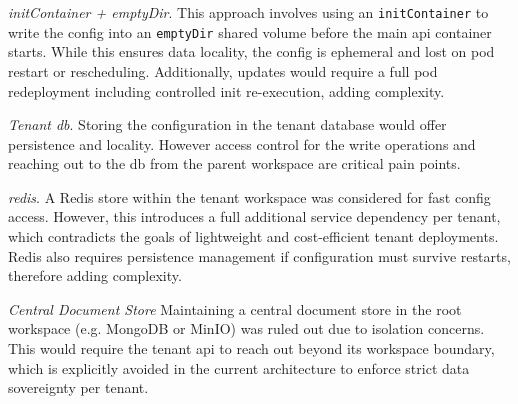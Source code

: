 \documentclass[11pt, a4paper, oneside, listof=totoc]{scrartcl}
\begin{document}
\begin{enumerate}[label={[\arabic*]:},
                    ref=Challenge~\arabic*,
                    leftmargin=*,
                    itemsep=0.6\baselineskip]
                    \item\label{chal:initContainer}
                        \textit{initContainer + emptyDir}.
                        This approach involves using an \texttt{initContainer} to write the config
                        into an \texttt{emptyDir} shared volume before the main \gls{api} container
                        starts.
                        While this ensures data locality, the config is ephemeral and lost on pod
                        restart or rescheduling.
                        Additionally, updates would require a full pod redeployment including
                        controlled init re-execution, adding complexity.

                    \item\label{chal:tenantDB}
                        \textit{Tenant \gls{db}}.
                        Storing the configuration in the tenant database would offer persistence and
                        locality.
                        However access control for the write operations and reaching out to the
                        \gls{db} from the parent workspace are critical pain points.

                    \item\label{chal:redis}
                        \textit{\gls{redis}}.
                        A Redis store within the tenant workspace was considered for fast config
                        access.
                        However, this introduces a full additional service dependency per tenant,
                        which contradicts the goals of lightweight and cost-efficient tenant
                        deployments.
                        Redis also requires persistence management if configuration must survive
                        restarts, therefore adding complexity.

                    \item\label{cahl:centralStore}
                        \textit{Central Document Store}
                        Maintaining a central document store in the root workspace (e.g. MongoDB or
                        MinIO) was ruled out due to isolation concerns.
                        This would require the tenant \gls{api} to reach out beyond its workspace
                        boundary, which is explicitly avoided in the current architecture to enforce
                        strict data sovereignty per tenant.
                \end{enumerate}
\end{document}
